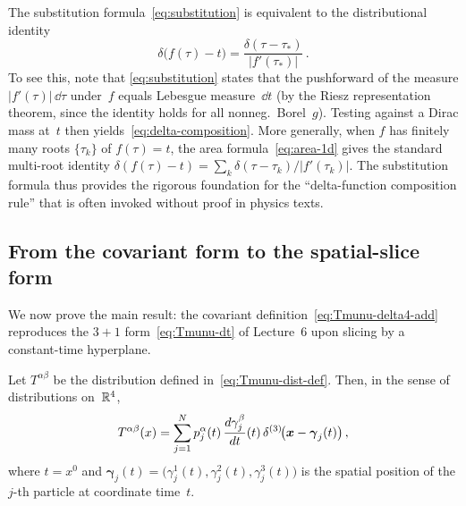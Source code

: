 \begin{remark}%
\label{rem:delta-composition}
  The substitution formula~\eqref{eq:substitution} is equivalent to
  the distributional identity
  \begin{equation}\label{eq:delta-composition}
    \delta\bigl(f(\tau) - t\bigr)
      = \frac{\delta(\tau - \tau_\ast)}{|f'(\tau_\ast)|}\,.
  \end{equation}
  To see this, note that \eqref{eq:substitution} states that
  the pushforward of the measure $|f'(\tau)|\,\dd\tau$ under~$f$
  equals Lebesgue measure~$\dd t$ (by the Riesz representation
  theorem, since the identity holds for all nonneg.\ Borel~$g$).
  Testing against a Dirac mass at~$t$ then
  yields~\eqref{eq:delta-composition}.  More generally, when $f$ has
  finitely many roots $\{\tau_k\}$ of $f(\tau) = t$, the area
  formula~\eqref{eq:area-1d} gives the standard multi-root identity
  $\delta(f(\tau) - t) = \sum_k
  \delta(\tau - \tau_k)/|f'(\tau_k)|$.  The substitution formula
  thus provides the rigorous foundation for the ``delta-function
  composition rule'' that is often invoked without proof in physics
  texts.
\end{remark}

\subsection{From the covariant form to the spatial-slice form}%
\label{sec:equivalence}

We now prove the main result: the covariant
definition~\eqref{eq:Tmunu-delta4-add} reproduces the $3{+}1$
form~\eqref{eq:Tmunu-dt} of Lecture~6 upon slicing by a
constant-time hyperplane.

\begin{theorem}\label{thm:equivalence}
  Let $T^{\alpha\beta}$ be the distribution defined
  in~\eqref{eq:Tmunu-dist-def}.  Then, in the sense of
  distributions on~$\mathbb{R}^{4}$,
  \begin{equation}\label{eq:equivalence}
    T^{\alpha\beta}(x) = \sum_{j=1}^{N} p_j^\alpha(t)\,
      \frac{d\gamma_j^\beta}{dt}(t)\,
      \delta^{(3)}\!\bigl(\boldsymbol{x} - \boldsymbol{\gamma}_j(t)\bigr)\,,
  \end{equation}
  where $t = x^0$ and $\boldsymbol{\gamma}_j(t) =
  \bigl(\gamma_j^1(t),\gamma_j^2(t),\gamma_j^3(t)\bigr)$ is the
  spatial position of the $j$-th particle at coordinate time~$t$.
\end{theorem}

